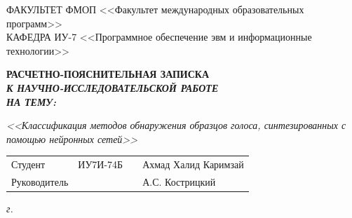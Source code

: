 \begin{titlepage}
	{
		\small \raggedright
		ФАКУЛЬТЕТ ФМОП <<Факультет международных образовательных программ>> \\
		\vspace{3.3mm}
		КАФЕДРА ИУ-7 <<Программное обеспечение эвм и информационные технологии>> \\
	}
	
	\vspace{20.8mm}
	
	{
		\LARGE \bfseries
		РАСЧЕТНО-ПОЯСНИТЕЛЬНАЯ ЗАПИСКА \\
	}
	\vspace{5mm}
	{
		\Large \bfseries \itshape
		К НАУЧНО-ИССЛЕДОВАТЕЛЬСКОЙ РАБОТЕ \\
		\vspace{5mm}
		НА ТЕМУ: \\
	}
	
	{
		\Large \itshape
		<<Классификация методов обнаружения образцов голоса, синтезированных с помощью нейронных сетей>>
	}
	
	\vfill
	
	\begin{tabular}{p{}PPT}
		Студент &  ИУ7‌И-74Б & \uline{} & Ахмад Халид Каримзай \\
		Руководитель & ~ &  \uline{} & А.С. Кострицкий  \\
		
	\end{tabular}
	
	\vspace{14mm}
	
	\textit{{\the\year} г.}
	
\end{titlepage}